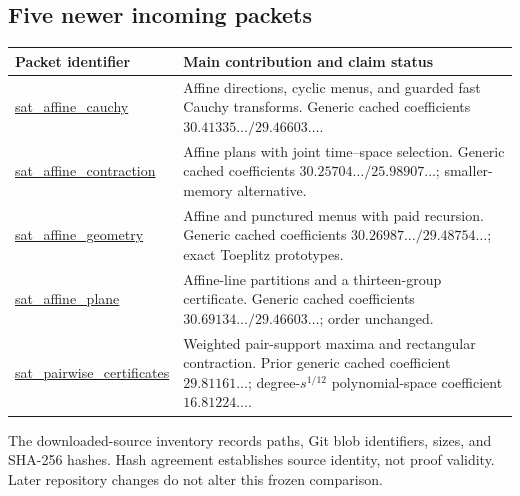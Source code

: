 \subsection*{Five newer incoming packets}
\begin{longtable}{>{\raggedright\arraybackslash}p{4.9cm}>{\raggedright\arraybackslash}p{10cm}}
\toprule Packet identifier & Main contribution and claim status\\
\midrule\endhead
\bottomrule\endfoot
\href{https://github.com/VladimirReshetnikov/ProveIt/blob/8e76d515063c4b9fbd8743a846b457e3a01bc039/docs/incoming/sat_affine_cauchy_2026-10-26.zip}{\textsf{sat\_\allowbreak affine\_\allowbreak cauchy}} & Affine directions, cyclic menus, and guarded fast Cauchy transforms. Generic cached coefficients $30.41335\ldots/29.46603\ldots$.\\[3pt]
\href{https://github.com/VladimirReshetnikov/ProveIt/blob/8e76d515063c4b9fbd8743a846b457e3a01bc039/docs/incoming/sat_affine_contraction_2026-10-26.zip}{\textsf{sat\_\allowbreak affine\_\allowbreak contraction}} & Affine plans with joint time--space selection. Generic cached coefficients $30.25704\ldots/25.98907\ldots$; smaller-memory alternative.\\[3pt]
\href{https://github.com/VladimirReshetnikov/ProveIt/blob/8e76d515063c4b9fbd8743a846b457e3a01bc039/docs/incoming/sat_affine_geometry_2026-10-26.zip}{\textsf{sat\_\allowbreak affine\_\allowbreak geometry}} & Affine and punctured menus with paid recursion. Generic cached coefficients $30.26987\ldots/29.48754\ldots$; exact Toeplitz prototypes.\\[3pt]
\href{https://github.com/VladimirReshetnikov/ProveIt/blob/8e76d515063c4b9fbd8743a846b457e3a01bc039/docs/incoming/sat_affine_plane_2026-10-26.zip}{\textsf{sat\_\allowbreak affine\_\allowbreak plane}} & Affine-line partitions and a thirteen-group certificate. Generic cached coefficients $30.69134\ldots/29.46603\ldots$; order unchanged.\\[3pt]
\href{https://github.com/VladimirReshetnikov/ProveIt/blob/8e76d515063c4b9fbd8743a846b457e3a01bc039/docs/incoming/sat_pairwise_certificates_2026-10-26.zip}{\textsf{sat\_\allowbreak pairwise\_\allowbreak certificates}} & Weighted pair-support maxima and rectangular contraction. Prior generic cached coefficient $29.81161\ldots$; degree-$s^{1/12}$ polynomial-space coefficient $16.81224\ldots$.\\[3pt]
\end{longtable}
\endgroup

The downloaded-source inventory records paths, Git blob identifiers, sizes,
and SHA-256 hashes. Hash agreement establishes source identity, not proof
validity. Later repository changes do not alter this frozen comparison.

